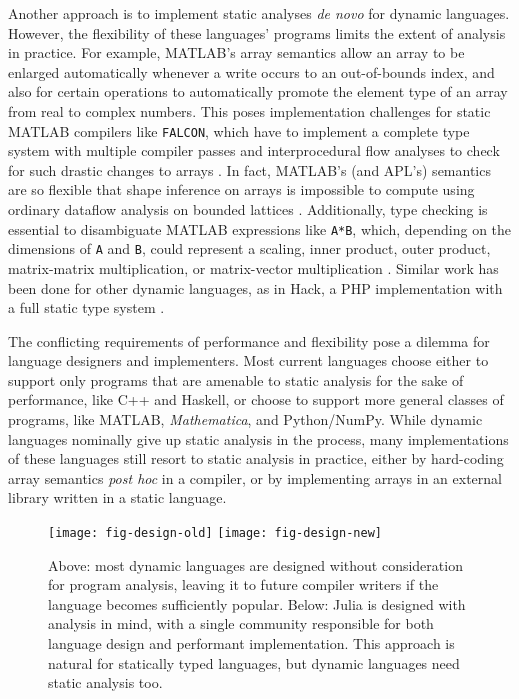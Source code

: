 \documentclass[preprint]{sigplanconf}
\newcommand{\MATLAB}{\textsc{MATLAB}}
\newcommand{\Mathematica}{\textit{Mathematica}}
\newcommand{\code}[1]{\texttt{#1}}
\begin{document}
Another approach is to implement static analyses
\textit{de novo} for dynamic languages. However, the flexibility
of these languages' programs limits the extent of analysis in practice. For example, \MATLAB's array
semantics allow an array to be enlarged automatically whenever a write occurs
to an out-of-bounds index, and also for certain operations to
automatically promote the element type of an array from real to complex
numbers. This poses implementation challenges for static \MATLAB{} compilers
like \code{FALCON}, which have to implement a complete type system with
multiple compiler passes and interprocedural flow analyses to check
for such drastic changes to arrays \cite{Rose:1999tt,
Li:2013mf}. In fact, \MATLAB's (and APL's) semantics are so flexible that shape
inference on arrays is impossible to compute using
ordinary dataflow analysis on bounded lattices \cite{Joisha:2006aa}.
Additionally, type checking is essential to disambiguate
\MATLAB{} expressions like \code{A*B}, which, depending on the dimensions of
\code{A} and \code{B}, could represent a scaling, inner product, outer
product, matrix-matrix multiplication, or matrix-vector multiplication
\cite{Rose:1999tt}. Similar work has been done for other dynamic languages,
as in Hack, a PHP implementation with a full static type system
\cite{Verlaguet:2014hn}.



The conflicting requirements of performance and flexibility pose a dilemma for
language designers and implementers. Most current languages choose either to
support only programs that are amenable to static analysis for the sake of
performance, like C++ and Haskell, or choose to support more general
classes of programs, like \MATLAB, \Mathematica, and Python/NumPy. While
dynamic languages nominally give up static analysis in the process, many
implementations of these languages still resort to static analysis in
practice, either by hard-coding array semantics \textit{post hoc} in a compiler, or by
implementing arrays in an external library written in a static language.





\begin{figure}
  \centering
  \texttt{[image: fig-design-old]}
  \texttt{[image: fig-design-new]}
  \caption{\label{fig:langdesign}
Above: most dynamic languages are designed without consideration for program
analysis, leaving it to future compiler writers if the language becomes
sufficiently popular.
Below: Julia is designed with analysis in mind, with a single community responsible
for both language design and performant implementation. This approach is
natural for statically typed languages, but dynamic languages need static analysis too.}
\end{figure}
\end{document}
